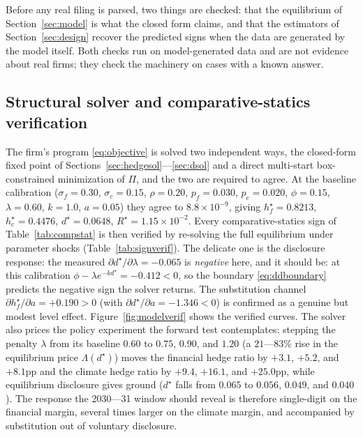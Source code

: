 \documentclass[11pt,a4paper]{article}
\begin{document}
Before any real filing is parsed, two things are checked: that the equilibrium of Section~\ref{sec:model} is what the closed form claims, and that the estimators of Section~\ref{sec:design} recover the predicted signs when the data are generated by the model itself. Both checks run on model-generated data and are not evidence about real firms; they check the machinery on cases with a known answer.

\subsection{Structural solver and comparative-statics verification}
\label{sec:solververif}

The firm's program \eqref{eq:objective} is solved two independent ways, the closed-form fixed point of Sections~\ref{sec:hedgesol}---\ref{sec:dsol} and a direct multi-start box-constrained minimization of $\Pi$, and the two are required to agree. At the baseline calibration ($\sigma_f{=}0.30$, $\sigma_c{=}0.15$, $\rho{=}0.20$, $p_f{=}0.030$, $p_c{=}0.020$, $\phi{=}0.15$, $\lambda{=}0.60$, $k{=}1.0$, $a{=}0.05$) they agree to $8.8\times10^{-9}$, giving $h_f^\star=0.8213$, $h_c^\star=0.4476$, $d^\star=0.0648$, $R^\star=1.15\times10^{-2}$. Every comparative-statics sign of Table~\ref{tab:compstat} is then verified by re-solving the full equilibrium under parameter shocks (Table~\ref{tab:signverif}). The delicate one is the disclosure response: the measured $\partial d^\star/\partial\lambda=-0.065$ is \emph{negative} here, and it should be: at this calibration $\phi-\lambda e^{-kd^\star}=-0.412<0$, so the boundary \eqref{eq:ddboundary} predicts the negative sign the solver returns. The substitution channel $\partial h_f^\star/\partial a=+0.190>0$ (with $\partial d^\star/\partial a=-1.346<0$) is confirmed as a genuine but modest level effect. Figure~\ref{fig:modelverif} shows the verified curves. The solver also prices the policy experiment the forward test contemplates: stepping the penalty $\lambda$ from its baseline $0.60$ to $0.75$, $0.90$, and $1.20$ (a $21$---$83\%$ rise in the equilibrium price $\Lambda(d^\star)$) moves the financial hedge ratio by $+3.1$, $+5.2$, and $+8.1$pp and the climate hedge ratio by $+9.4$, $+16.1$, and $+25.0$pp, while equilibrium disclosure gives ground ($d^\star$ falls from $0.065$ to $0.056$, $0.049$, and $0.040$). The response the 2030---31 window should reveal is therefore single-digit on the financial margin, several times larger on the climate margin, and accompanied by substitution out of voluntary disclosure.
\end{document}
